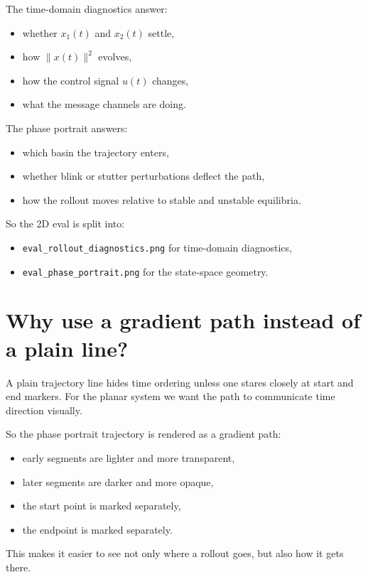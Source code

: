 The time-domain diagnostics answer:
\begin{itemize}
    \item whether $x_1(t)$ and $x_2(t)$ settle,
    \item how $\|x(t)\|^2$ evolves,
    \item how the control signal $u(t)$ changes,
    \item what the message channels are doing.
\end{itemize}

The phase portrait answers:
\begin{itemize}
    \item which basin the trajectory enters,
    \item whether blink or stutter perturbations deflect the path,
    \item how the rollout moves relative to stable and unstable equilibria.
\end{itemize}

So the 2D eval is split into:
\begin{itemize}
    \item \texttt{eval\_rollout\_diagnostics.png} for time-domain diagnostics,
    \item \texttt{eval\_phase\_portrait.png} for the state-space geometry.
\end{itemize}

\section{Why use a gradient path instead of a plain line?}

A plain trajectory line hides time ordering unless one stares closely at start and end markers. For the planar system we want the path to communicate time direction visually.

So the phase portrait trajectory is rendered as a gradient path:
\begin{itemize}
    \item early segments are lighter and more transparent,
    \item later segments are darker and more opaque,
    \item the start point is marked separately,
    \item the endpoint is marked separately.
\end{itemize}

This makes it easier to see not only where a rollout goes, but also how it gets there.


